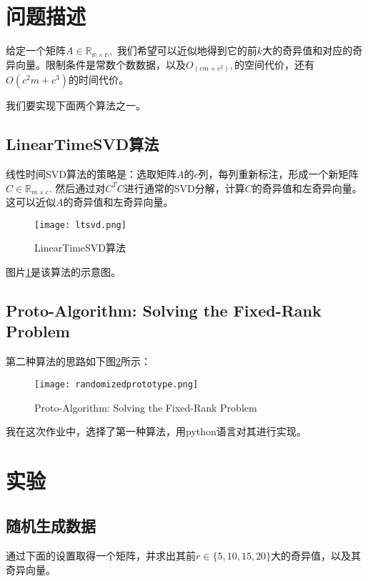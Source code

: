 \documentclass[12pt,letterpaper]{article}
\begin{document}
\section*{问题描述}

给定一个矩阵$A\in \mathbb{R_{m\times n}},$ 我们希望可以近似地得到它的前$k$大的奇异值和对应的奇异向量。限制条件是常数个数数据，以及$O_(cm + c^2),$的空间代价，还有$O(c^2m + c^3)$的时间代价。

我们要实现下面两个算法之一。

\subsection*{LinearTimeSVD算法}

线性时间SVD算法的策略是：选取矩阵$A$的$c$列，每列重新标注，形成一个新矩阵$C\in\mathbb{R}_{m\times c}.$ 然后通过对$C^TC$进行通常的SVD分解，计算$C$的奇异值和左奇异向量。这可以近似$A$的奇异值和左奇异向量。

\begin{figure}[h]
    \centering
    \texttt{[image: ltsvd.png]}
    \caption{LinearTimeSVD算法}
    \label{ltsvd}
\end{figure}

图片\ref{ltsvd}是该算法的示意图。

\subsection*{Proto-Algorithm: Solving the Fixed-Rank Problem}

第二种算法的思路如下图\ref{pasfrp}所示：

\begin{figure}[h]
    \centering
    \texttt{[image: randomizedprototype.png]}
    \caption{Proto-Algorithm: Solving the Fixed-Rank Problem}
    \label{pasfrp}
\end{figure}

我在这次作业中，选择了第一种算法，用python语言对其进行实现。

\section*{实验}

\subsection*{随机生成数据}

通过下面的设置取得一个矩阵，并求出其前$r\in\{5,10,15,20\}$大的奇异值，以及其奇异向量。
\end{document}
